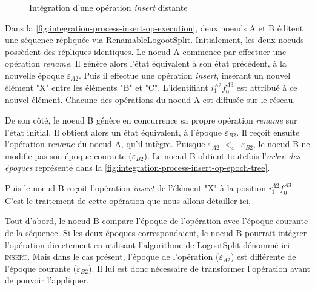 \documentclass[12pt]{thesul}
\newcommand{\trm}[1]{\mathit{#1}}
\newcommand{\id}[3]{$\trm{#1}^{\trm{#2}}_{\trm{#3}}$}
\newcommand{\epoch}[1]{$\varepsilon_{#1}$}
\newcommand{\lepoch}{$<_{\varepsilon}$~}
\begin{document}
\begin{figure}[t!]
{\begin{minipage}{\linewidth}
        \label{fig:integration-process-insert-op-epoch-tree}
    \end{minipage}}
  \caption{Intégration d'une opération \emph{insert} distante}
  \label{fig:integration-process-insert-op}
\end{figure}


Dans la \autoref{fig:integration-process-insert-op-execution}, deux noeuds A et B éditent une séquence répliquée via RenamableLogootSplit.
Initialement, les deux noeuds possèdent des répliques identiques.
Le noeud A commence par effectuer une opération \emph{rename}.
Il génère alors l'état équivalent à son état précédent, à la nouvelle époque \epoch{A2}.
Puis il effectue une opération \emph{insert}, insérant un nouvel élément "X" entre les éléments "B" et "C".
L'identifiant \id{i}{A2}{1}\id{f}{A3}{0} est attribué à ce nouvel élément.
Chacune des opérations du noeud A est diffusée sur le réseau.

De son côté, le noeud B génère en concurrence sa propre opération \emph{rename} sur l'état initial.
Il obtient alors un état équivalent, à l'époque \epoch{B2}.
Il reçoit ensuite l'opération \emph{rename} du noeud A, qu'il intègre.
Puisque \epoch{A2} \lepoch \epoch{B2}, le noeud B ne modifie pas son époque courante (\epoch{B2}).
Le noeud B obtient toutefois l'\emph{arbre des époques} représenté dans la \autoref{fig:integration-process-insert-op-epoch-tree}.

Puis le noeud B reçoit l'opération \emph{insert} de l'élément "X" à la position \id{i}{A2}{1}\id{f}{A3}{0}.
C'est le traitement de cette opération que nous allons détailler ici.

Tout d'abord, le noeud B compare l'époque de l'opération avec l'époque courante de la séquence.
Si les deux époques correspondaient, le noeud B pourrait intégrer l'opération directement en utilisant l'algorithme de LogootSplit dénommé ici \textsc{insert}.
Mais dans le cas présent, l'époque de l'opération (\epoch{A2}) est différente de l'époque courante (\epoch{B2}).
Il lui est donc nécessaire de transformer l'opération avant de pouvoir l'appliquer.
\end{document}
